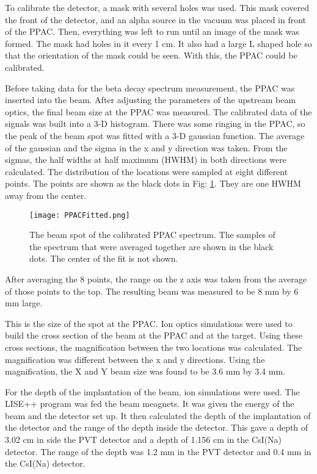 To calibrate the detector, a mask with several holes was used. 
This mask covered the front of the detector, and an alpha source in the vacuum was placed in front of the PPAC.
Then, everything was left to run until an image of the mask was formed.
The mask had holes in it every 1 cm. 
It also had a large L shaped hole so that the orientation of the mask could be seen. 
With this, the PPAC could be calibrated.

Before taking data for the beta decay spectrum measurement, the PPAC was inserted into the beam.
After adjusting the parameters of the upstream beam optics, the final beam size at the PPAC was measured.
The calibrated data of the signals was built into a 3-D histogram.
There was some ringing in the PPAC, so the peak of the beam spot was fitted with a 3-D gaussian function.
The average of the gaussian and the sigma in the x and y direction was taken. 
From the sigmas, the half widths at half maximum (HWHM) in both directions were calculated. 
The distribution of the locations were sampled at eight different points. 
The points are shown as the black dots in Fig: \ref{fig:PPACSpotch}.
They are one HWHM away from the center. 

\begin{figure}
	\texttt{[image: PPACFitted.png]}
	\caption{The beam spot of the calibrated PPAC spectrum. 
		 The samples of the spectrum that were averaged together are shown in the black dots.
		 The center of the fit is not shown.}
	\label{fig:PPACSpotch}
\end{figure}  

After averaging the 8 points, the range on the z axis was taken from the average of those points to the top.
The resulting beam was measured to be 8 mm by 6 mm large.

This is the size of the spot at the PPAC. 
Ion optics simulations were used to build the cross section of the beam at the PPAC and at the target.
Using these cross sections, the magnification between the two locations was calculated.
The magnification was different between the x and y directions.
Using the magnification, the X and Y beam size was found to be 3.6 mm by 3.4 mm.

For the depth of the implantation of the beam, ion simulations were used.
The LISE++ program was fed the beam meagnets.
It was given the energy of the beam and the detector set up.
It then calculated the depth of the implantation of the detector and the range of the depth inside the detector.
This gave a depth of 3.02 cm in side the PVT detector and a depth of 1.156 cm in the CsI(Na) detector.
The range of the depth was 1.2 mm in the PVT detector and 0.4 mm in the CsI(Na) detector. 


